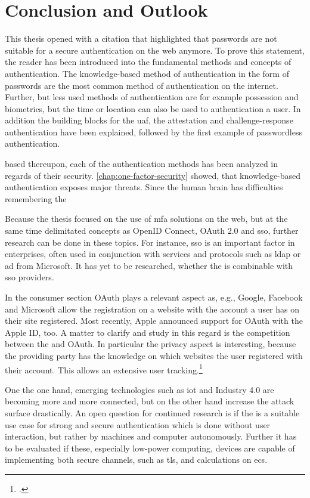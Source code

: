 \chapter{Conclusion and Outlook}

This thesis opened with a citation that highlighted that passwords are not suitable for a secure authentication on the web anymore. To prove this statement, the reader has been introduced into the fundamental methods and concepts of authentication. The knowledge-based method of authentication in the form of passwords are the most common method of authentication on the internet. Further, but less used methods of authentication are for example possession and biometrics, but the time or location can also be used to authentication a user. In addition the building blocks for the \gls{uaf}, the attestation and challenge-response authentication have been explained, followed by the first example of passwordless authentication.

based thereupon, each of the authentication methods has been analyzed in regards of their security. \autoref{chap:one-factor-security} showed, that knowledge-based authentication exposes major threats. Since the human brain has difficulties remembering the 

Because the thesis focused on the use of \gls{mfa} solutions on the web, but at the same time delimitated concepts as OpenID Connect, OAuth 2.0 and \gls{sso}, further research can be done in these topics. For instance, \gls{sso} is an important factor in enterprises, often used in conjunction with services and protocols such as \gls{ldap} or \gls{ad} from Microsoft. It has yet to be researched, whether the \wa{} is combinable with \gls{sso} providers.

In the consumer section OAuth plays a relevant aspect as, e.g., Google, Facebook and Microsoft allow the registration on a website with the account a user has on their site registered. Most recently, Apple announced support for OAuth with the Apple ID, too. A matter to clarify and study in this regard is the competition between the \wa{} and OAuth. In particular the privacy aspect is interesting, because the providing party has the knowledge on which websites the user registered with their account. This allows an extensive user tracking.\footcites[See][18]{fido-ct-2}[See][4]{osti_1257179}

One the one hand, emerging technologies such as \gls{iot} and Industry 4.0 are becoming more and more connected, but on the other hand increase the attack surface drastically. An open question for continued research is if the \wa{} is a suitable use case for strong and secure authentication which is done without user interaction, but rather by machines and computer autonomously. Further it has to be evaluated if these, especially low-power computing, devices are capable of implementing both secure channels, such as \gls{tls}, and calculations on \glspl{ec}.

